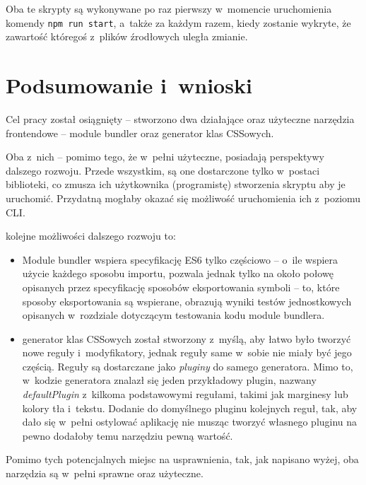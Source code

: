 \documentclass{SGGW-thesis}
\begin{document}
Oba te skrypty są wykonywane po raz pierwszy w~momencie uruchomienia komendy \verb|npm run start|, a~także za każdym razem, kiedy zostanie wykryte, że zawartość któregoś z~plików źrodłowych uległa zmianie.

\chapter{Podsumowanie i~wnioski}
Cel pracy został osiągnięty -- stworzono dwa działające oraz użyteczne narzędzia frontendowe -- module bundler oraz generator klas CSSowych.

Oba z~nich -- pomimo tego, że w~pełni użyteczne, posiadają perspektywy dalszego rozwoju.
Przede wszystkim, są one dostarczone tylko w~postaci biblioteki, co zmusza ich użytkownika (programistę) stworzenia skryptu aby je uruchomić. Przydatną mogłaby okazać się możliwość uruchomienia ich z~poziomu CLI.

kolejne możliwości dalszego rozwoju to:
\begin{itemize}
    \item Module bundler wspiera specyfikację ES6 tylko częściowo -- o~ile wspiera użycie każdego sposobu importu, pozwala jednak tylko na około połowę opisanych przez specyfikację sposobów eksportowania symboli -- to, które sposoby eksportowania są wspierane, obrazują wyniki testów jednostkowych opisanych w~rozdziale dotyczącym testowania kodu module bundlera.
    \item generator klas CSSowych został stworzony z~myślą, aby łatwo było tworzyć nowe reguły i~modyfikatory, jednak reguły same w~sobie nie miały być jego częścią. Reguły są dostarczane jako \emph{pluginy} do samego generatora. Mimo to, w~kodzie generatora znalazł się jeden przykładowy plugin, nazwany \emph{defaultPlugin} z~kilkoma podstawowymi regułami, takimi jak marginesy lub kolory tła i~tekstu. Dodanie do domyślnego pluginu kolejnych reguł, tak, aby dało się w~pełni ostylować aplikację nie musząc tworzyć własnego pluginu na pewno dodałoby temu narzędziu pewną wartość.
\end{itemize}

Pomimo tych potencjalnych miejsc na usprawnienia, tak, jak napisano wyżej, oba narzędzia są w~pełni sprawne oraz użyteczne.
\end{document}

